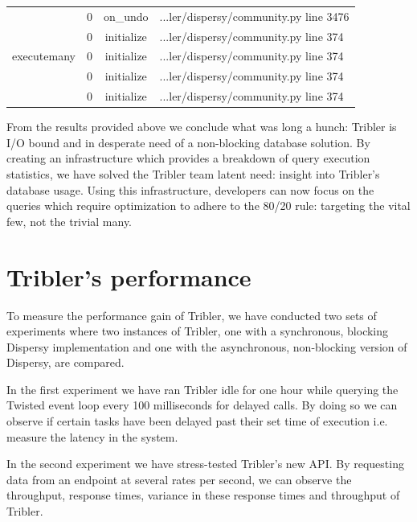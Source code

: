 \begin{table}[!h]
{\begin{tabular}{|c|c|c|l|}
		\multicolumn{1}{|c|}{\multirow{5}{*}{executemany}} & \multicolumn{1}{c|}{0} & \multicolumn{1}{c|}{on\_undo} & \multicolumn{1}{l|}{...ler/dispersy/community.py line 3476} \\ \cline{2-4}
		\multicolumn{1}{|c|}{} & \multicolumn{1}{c|}{0}  & \multicolumn{1}{c|}{initialize}  & \multicolumn{1}{l|}{...ler/dispersy/community.py line 374}  \\ \cline{2-4} 
		\multicolumn{1}{|c|}{} & \multicolumn{1}{c|}{0}  & \multicolumn{1}{c|}{initialize}  & \multicolumn{1}{l|}{...ler/dispersy/community.py line 374}  \\ \cline{2-4} 
		\multicolumn{1}{|c|}{} & \multicolumn{1}{c|}{0}  & \multicolumn{1}{c|}{initialize}  & \multicolumn{1}{l|}{...ler/dispersy/community.py line 374}  \\ \cline{2-4} 
		\multicolumn{1}{|c|}{} & \multicolumn{1}{c|}{0}  & \multicolumn{1}{c|}{initialize}  & \multicolumn{1}{l|}{...ler/dispersy/community.py line 374}  \\ \hline 
	\end{tabular}}
\end{table}

From the results provided above we conclude what was long a hunch: Tribler is I/O bound and in desperate need of a non-blocking database solution.
By creating an infrastructure which provides a breakdown of query execution statistics, we have solved the Tribler team latent need: insight into Tribler's database usage.
Using this infrastructure, developers can now focus on the queries which require optimization to adhere to the 80/20 rule: targeting the vital few, not the trivial many.

\section{Tribler's performance}

To measure the performance gain of Tribler, we have conducted two sets of experiments where two instances of Tribler, one with a synchronous, blocking Dispersy implementation and one with the asynchronous, non-blocking version of Dispersy, are compared.

In the first experiment we have ran Tribler idle for one hour while querying the Twisted event loop every 100 milliseconds for delayed calls.
By doing so we can observe if certain tasks have been delayed past their set time of execution i.e. measure the latency in the system.

In the second experiment we have stress-tested Tribler's new API.
By requesting data from an endpoint at several rates per second, we can observe the throughput, response times, variance in these response times and throughput of Tribler.

